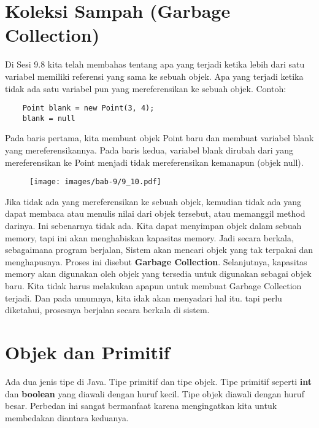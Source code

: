 \section{Koleksi Sampah (Garbage Collection)}
Di Sesi 9.8 kita telah membahas tentang apa yang terjadi ketika lebih dari satu variabel memiliki referensi yang sama ke sebuah objek. Apa yang terjadi ketika tidak ada satu variabel pun yang mereferensikan ke sebuah objek. Contoh:
\begin{lstlisting}
	Point blank = new Point(3, 4);
	blank = null
\end{lstlisting}
Pada baris pertama, kita membuat objek Point baru dan membuat variabel blank yang mereferensikannya. Pada baris kedua, variabel blank dirubah dari yang mereferensikan ke Point menjadi tidak mereferensikan kemanapun (objek null).
\begin{figure}[H]
	\centering \texttt{[image: images/bab-9/9\_10.pdf]}
\end{figure}
Jika tidak ada yang mereferensikan ke sebuah objek, kemudian tidak ada yang dapat membaca atau menulis nilai dari objek tersebut, atau memanggil method darinya. Ini sebenarnya tidak ada. Kita dapat menyimpan objek dalam sebuah memory, tapi ini akan menghabiskan kapasitas memory. Jadi secara berkala, sebagaimana program berjalan, Sistem akan mencari objek yang tak terpakai dan menghapusnya. Proses ini disebut \textbf{Garbage Collection}. Selanjutnya, kapasitas memory akan digunakan oleh objek yang tersedia untuk digunakan sebagai objek baru.
Kita tidak harus melakukan apapun untuk membuat Garbage Collection terjadi. Dan pada umumnya, kita idak akan menyadari hal itu. tapi perlu diketahui, prosesnya berjalan secara berkala di sistem.

\section{Objek dan Primitif}
Ada dua jenis tipe di Java. Tipe primitif dan tipe objek. Tipe primitif seperti \textbf{int} dan \textbf{boolean} yang diawali dengan huruf kecil. Tipe objek diawali dengan huruf besar. Perbedan ini sangat bermanfaat karena mengingatkan kita untuk membedakan diantara keduanya.

